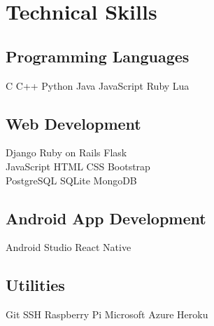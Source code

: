 \documentclass[]{deedy-resume-openfont}
\begin{document}
%
%

\section{Technical Skills}
\vspace{\topsep} %
\begin{minipage}[t]{.6\textwidth}
\subsection{Programming Languages}
\begin{large}

C \textbullet{}   C++ \textbullet{} Python \textbullet{} Java \textbullet{}
JavaScript \textbullet{} Ruby \textbullet{} Lua \\
\end{large}
\subsection{Web Development}
\begin{large}
Django \textbullet{} Ruby on Rails \textbullet{} Flask \\
JavaScript \textbullet{} HTML \textbullet{} CSS \textbullet{} Bootstrap \\
PostgreSQL \textbullet{} SQLite \textbullet{} MongoDB
\end{large}
\sectionsep
\end{minipage}
\hfill
\begin{minipage}[t]{.35\textwidth}
\subsection{Android App Development}
\begin{large}
Android Studio \textbullet{} React Native \\
\end{large}
\subsection{Utilities}
\begin{large}
Git \textbullet{} SSH \textbullet{} Raspberry Pi \textbullet{} Microsoft Azure \textbullet{} Heroku
\end{large}
\end{minipage}
\sectionsep
\end{document}
